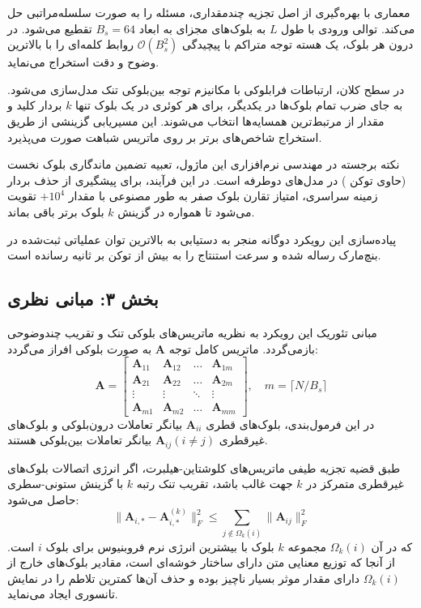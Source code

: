معماری  با بهره‌گیری از اصل تجزیه چندمقداری، مسئله را به صورت سلسله‌مراتبی حل می‌کند. توالی ورودی با طول $L$ به بلوک‌های مجزای به ابعاد $B_s = 64$ تقطیع می‌شود. در درون هر بلوک، یک هسته توجه متراکم با پیچیدگی $\mathcal{O}(B_s^2)$ روابط کلمه‌ای را با بالاترین وضوح و دقت استخراج می‌نماید.

در سطح کلان، ارتباطات فرابلوکی با مکانیزم توجه بین‌بلوکی تنک مدل‌سازی می‌شود. به جای ضرب تمام بلوک‌ها در یکدیگر، برای هر کوئری در یک بلوک تنها $k$ بردار کلید و مقدار از مرتبط‌ترین همسایه‌ها انتخاب می‌شوند. این مسیریابی گزینشی از طریق استخراج شاخص‌های برتر  بر روی ماتریس شباهت صورت می‌پذیرد.

نکته برجسته در مهندسی نرم‌افزاری این ماژول، تعبیه تضمین ماندگاری بلوک نخست (حاوی توکن ) در مدل‌های دوطرفه است. در این فرآیند، برای پیشگیری از حذف بردار زمینه سراسری، امتیاز تقارن بلوک صفر به طور مصنوعی با مقدار $+10^4$ تقویت می‌شود تا همواره در گزینش $k$ بلوک برتر باقی بماند.

پیاده‌سازی این رویکرد دوگانه منجر به دستیابی به بالاترین توان عملیاتی ثبت‌شده در بنچ‌مارک رساله شده و سرعت استنتاج را به بیش از  توکن بر ثانیه رسانده است.

\subsection*{بخش ۳: مبانی نظری }
مبانی تئوریک این رویکرد به نظریه ماتریس‌های بلوکی تنک و تقریب چندوضوحی  بازمی‌گردد. ماتریس کامل توجه $\mathbf{A}$ به صورت بلوکی افراز می‌گردد:
\begin{equation}
\mathbf{A} = \begin{bmatrix}
\mathbf{A}_{11} & \mathbf{A}_{12} & \dots & \mathbf{A}_{1m} \\
\mathbf{A}_{21} & \mathbf{A}_{22} & \dots & \mathbf{A}_{2m} \\
\vdots & \vdots & \ddots & \vdots \\
\mathbf{A}_{m1} & \mathbf{A}_{m2} & \dots & \mathbf{A}_{mm}
\end{bmatrix}, \quad m = \lceil N / B_s \rceil
\end{equation}
در این فرمول‌بندی، بلوک‌های قطری $\mathbf{A}_{ii}$ بیانگر تعاملات درون‌بلوکی  و بلوک‌های غیرقطری $\mathbf{A}_{ij} (i \ne j)$ بیانگر تعاملات بین‌بلوکی هستند.

طبق قضیه تجزیه طیفی ماتریس‌های کلوشتاین-هیلبرت، اگر انرژی اتصالات بلوک‌های غیرقطری متمرکز در $k$ جهت غالب باشد، تقریب تنک رتبه $k$ با گزینش ستونی-سطری حاصل می‌شود:
\begin{equation}
\|\mathbf{A}_{i,*} - \mathbf{A}_{i,*}^{(k)}\|_F^2 \le \sum_{j \notin \Omega_k(i)} \|\mathbf{A}_{ij}\|_F^2
\end{equation}
که در آن $\Omega_k(i)$ مجموعه $k$ بلوک با بیشترین انرژی نرم فروبنیوس برای بلوک $i$ است. از آنجا که توزیع معنایی متن دارای ساختار خوشه‌ای است، مقادیر بلوک‌های خارج از $\Omega_k(i)$ دارای مقدار موثر بسیار ناچیز بوده و حذف آن‌ها کمترین تلاطم را در نمایش تانسوری ایجاد می‌نماید.

